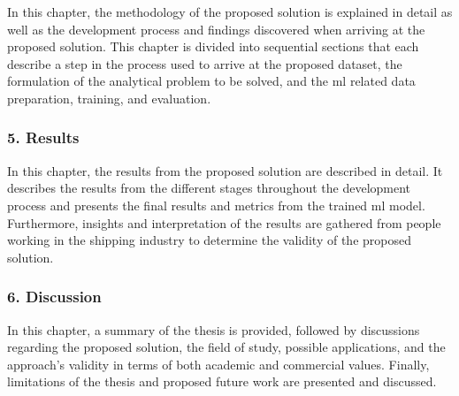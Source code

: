 In this chapter, the methodology of the proposed solution is explained in detail as well as the development process and findings discovered when arriving at the proposed solution. This chapter is divided into sequential sections that each describe a step in the process used to arrive at the proposed dataset, the formulation of the analytical problem to be solved, and the \acrfull{ml} related data preparation, training, and evaluation.

\subsubsection{5. Results}

In this chapter, the results from the proposed solution are described in detail. It describes the results from the different stages throughout the development process and presents the final results and metrics from the trained \acrfull{ml} model. Furthermore, insights and interpretation of the results are gathered from people working in the shipping industry to determine the validity of the proposed solution.

\subsubsection{6. Discussion}

In this chapter, a summary of the thesis is provided, followed by discussions regarding the proposed solution, the field of study, possible applications, and the approach's validity in terms of both academic and commercial values. Finally, limitations of the thesis and proposed future work are presented and discussed.
